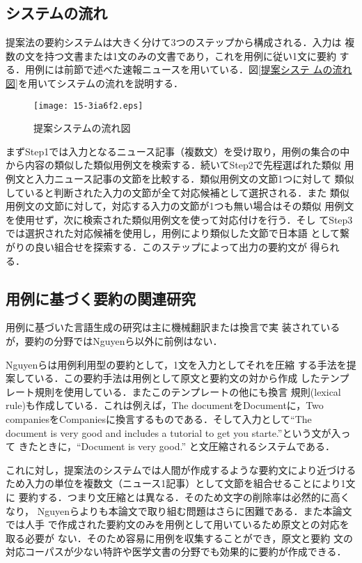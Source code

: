 \documentclass[japanese]{jnlp_1.4}
\begin{document}
\subsection{システムの流れ}\label{節:システムの流れ}

提案法の要約システムは大きく分けて3つのステップから構成される．入力は
複数の文を持つ文書または1文のみの文書であり，これを用例に従い1文に要約
する．用例には前節で述べた速報ニュースを用いている．図\ref{提案システ
ムの流れ図}を用いてシステムの流れを説明する．

\begin{figure}[b]
\begin{center}
\texttt{[image: 15-3ia6f2.eps]}
 \caption{提案システムの流れ図} \label{提案システムの流れ図}
\end{center}
\end{figure}

まずStep1では入力となるニュース記事（複数文）を受け取り，用例の集合の中
から内容の類似した類似用例文を検索する．続いてStep2で先程選ばれた類似
用例文と入力ニュース記事の文節を比較する．類似用例文の文節1つに対して
類似していると判断された入力の文節が全て対応候補として選択される．また
類似用例文の文節に対して，対応する入力の文節が1つも無い場合はその類似
用例文を使用せず，次に検索された類似用例文を使って対応付けを行う．そし
てStep3では選択された対応候補を使用し，用例により類似した文節で日本語
として繋がりの良い組合せを探索する．このステップによって出力の要約文が
得られる．

\subsection{用例に基づく要約の関連研究}

用例に基づいた言語生成の研究は主に機械翻訳または換言で実
装されているが，要約の分野ではNguyenら\cite{Le:2004}以外に前例はない．

Nguyenら\cite{Le:2004}は用例利用型の要約として，1文を入力としてそれを圧縮
する手法を提案している．この要約手法は用例として原文と要約文の対から作成
したテンプレート規則を使用している．またこのテンプレートの他にも換言
規則(lexical rule)も作成している．これは例えば，The documentをDocumentに，Two
companiesをCompaniesに換言するものである．そして入力として``The document
is very good and includes a tutorial to get you starte.''という文が入って
きたときに，``Document is very good.''  と文圧縮されるシステムである．

これに対し，提案法のシステムでは人間が作成するような要約文により近づける
ため入力の単位を複数文（ニュース1記事）として文節を組合せることにより1文に
要約する．つまり文圧縮とは異なる．そのため文字の削除率は必然的に高くなり，
Nguyenらよりも本論文で取り組む問題はさらに困難である．また本論文では人手
で作成された要約文のみを用例として用いているため原文との対応を取る必要が
ない．そのため容易に用例を収集することができ，原文と要約
文の対応コーパスが少ない特許や医学文書の分野でも効果的に要約が作成できる．
\end{document}
